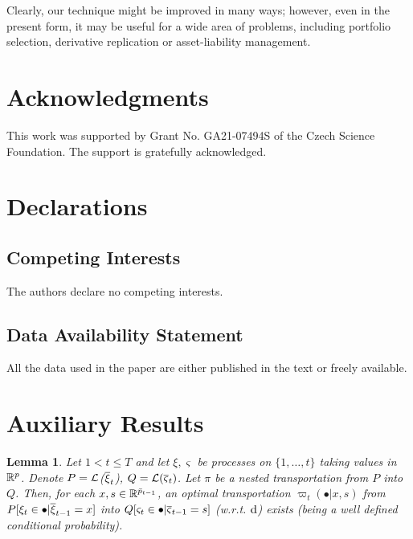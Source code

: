 \documentclass{article}              %
\newtheorem{lemma}{Lemma}
\begin{document}
Clearly, our technique might be improved in many ways; however, even in the present form, it may be useful for a wide area of problems, including portfolio selection, derivative replication or asset-liability management. 


\section*{Acknowledgments}

This work was supported by Grant No. GA21-07494S of the Czech Science Foundation. The support is gratefully acknowledged.

\section*{Declarations}

\subsection*{Competing Interests}

The authors declare no competing interests.

\subsection*{Data Availability Statement}

All the data used in the paper are either published in the text or freely available.



%




\appendix

\section{Auxiliary Results}
 
 
\begin{lemma}
\label{lem:cw}Let $1<t\leq T$ and let $\xi,\varsigma$ be processes on $\{1,\dots,t\}$ taking values in $\mathbb{R}^p$. 
Denote $P=\mathcal{L}$($\overline{\xi}_{t}$), $Q=\mathcal{L}(\overline{\varsigma}_{t})$.
Let $\pi$ be a nested transportation from $P$ into $Q$. Then, for
each $x,s\in\mathbb{R}^{\bar{p}_{t-1}}$, an optimal transportation $\varpi_{t}(\bullet|x,s)$
from $P[\xi_{t}\in\bullet|\overline{\xi}_{t-1}=x]$ into $Q[\varsigma_{t}\in\bullet|\overline{\varsigma}_{t-1}=s]$
(w.r.t. $\mathrm{d}$) exists 
(being a well defined conditional probability).
\end{lemma}
\end{document}
